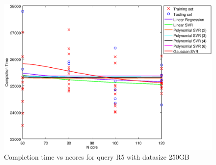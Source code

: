 
\begin {figure}[hbtp]
\centering
\includegraphics[width=\textwidth]{output/R5_250_1_OVER_NCORES/plot_R5_250.eps}
\caption{Completion time vs ncores for query R5 with datasize 250GB}
\label{fig:all_nonlinear_R5_250}
\end {figure}
